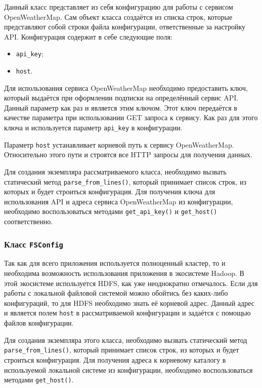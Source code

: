 Данный класс представляет из себя конфигурацию для работы с сервисом OpenWeatherMap.
Сам объект класса создаётся из списка строк, которые представляют собой строки файла конфигурации, ответственные за настройку API.
Конфигурация содержит в себе следующие поля:
\begin{itemize}
    \item \texttt{api\_key};
    \item \texttt{host}.
\end{itemize}

Для использования сервиса OpenWeatherMap необходимо предоставить ключ, который выдаётся при оформлении подписки на определённый сервис API.
Данный параметр как раз и является этим ключом.
Этот ключ передаётся в качестве параметра при использовании GET запроса к сервису.
Как раз для этого ключа и используется параметр \texttt{api\_key} в конфигурации.

Параметр \texttt{host} устанавливает корневой путь к сервису OpenWeatherMap.
Относительно этого пути и строятся все HTTP запросы для получения данных.

Для создания экземпляра рассматриваемого класса, необходимо вызвать статический метод \texttt{parse\_from\_lines()}, который принимает список строк, из которых и будет строиться конфигурация.
Для получения ключа для использования API и адреса сервиса OpenWeatherMap из конфигурации, необходимо воспользоваться методами \texttt{get\_api\_key()} и \texttt{get\_host()} соответственно.

\subsubsection{Класс \texttt{FSConfig}}

Так как для всего приложения используется полноценный кластер, то и необходима возможность использования приложения в экосистеме Hadoop.
В этой экосистеме используется HDFS, как уже неоднократно отмечалось.
Если для работы с локальной файловой системой можно обойтись без каких-либо конфигураций, то для HDFS необходимо знать её корневой адрес.
Данный адрес и является полем \texttt{host} в рассматриваемой конфигурации и задаётся с помощью файлов конфигурации.

Для создания экземпляра этого класса, необходимо вызвать статический метод \texttt{parse\_from\_lines()}, который принимает список строк, из которых и будет строиться конфигурация.
Для получения адреса к корневому каталогу в используемой локальной системе из конфигурации, необходимо воспользоваться методами \texttt{get\_host()}.

